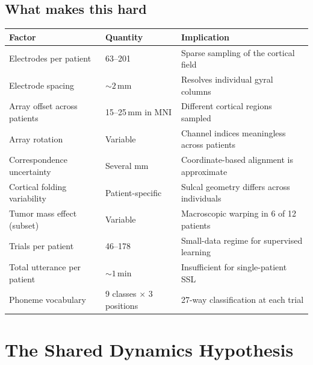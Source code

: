 \documentclass[11pt,letterpaper]{article}
\begin{document}
\subsection{What makes this hard}

\begin{table}[h]
\centering\small
\begin{tabular}{@{}lll@{}}
\toprule
\textbf{Factor} & \textbf{Quantity} & \textbf{Implication} \\
\midrule
Electrodes per patient & 63--201 & Sparse sampling of the cortical field \\
Electrode spacing & ${\sim}2$\,mm & Resolves individual gyral columns \\
Array offset across patients & 15--25\,mm in MNI & Different cortical regions sampled \\
Array rotation & Variable & Channel indices meaningless across patients \\
Correspondence uncertainty & Several mm & Coordinate-based alignment is approximate \\
Cortical folding variability & Patient-specific & Sulcal geometry differs across individuals \\
Tumor mass effect (subset) & Variable & Macroscopic warping in 6 of 12 patients \\
Trials per patient & 46--178 & Small-data regime for supervised learning \\
Total utterance per patient & ${\sim}1$\,min & Insufficient for single-patient SSL \\
Phoneme vocabulary & 9 classes $\times$ 3 positions & 27-way classification at each trial \\
\bottomrule
\end{tabular}
\end{table}


\section{The Shared Dynamics Hypothesis}
\end{document}

